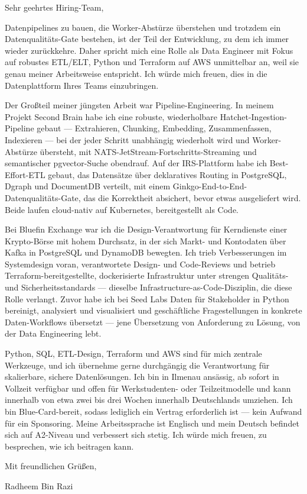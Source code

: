 \documentclass[11pt,a4paper]{coverletter}
\begin{document}
\opening{Sehr geehrtes Hiring-Team,}

Datenpipelines zu bauen, die Worker-Abstürze überstehen und trotzdem ein Datenqualitäts-Gate bestehen, ist der Teil der Entwicklung, zu dem ich immer wieder zurückkehre. Daher spricht mich eine Rolle als Data Engineer mit Fokus auf robustes ETL/ELT, Python und Terraform auf AWS unmittelbar an, weil sie genau meiner Arbeitsweise entspricht. Ich würde mich freuen, dies in die Datenplattform Ihres Teams einzubringen.

Der Großteil meiner jüngsten Arbeit war Pipeline-Engineering. In meinem Projekt Second Brain habe ich eine robuste, wiederholbare Hatchet-Ingestion-Pipeline gebaut — Extrahieren, Chunking, Embedding, Zusammenfassen, Indexieren — bei der jeder Schritt unabhängig wiederholt wird und Worker-Abstürze übersteht, mit NATS-JetStream-Fortschritts-Streaming und semantischer pgvector-Suche obendrauf. Auf der IRS-Plattform habe ich Best-Effort-ETL gebaut, das Datensätze über deklaratives Routing in PostgreSQL, Dgraph und DocumentDB verteilt, mit einem Ginkgo-End-to-End-Datenqualitäts-Gate, das die Korrektheit absichert, bevor etwas ausgeliefert wird. Beide laufen cloud-nativ auf Kubernetes, bereitgestellt als Code.

Bei Bluefin Exchange war ich die Design-Verantwortung für Kerndienste einer Krypto-Börse mit hohem Durchsatz, in der sich Markt- und Kontodaten über Kafka in PostgreSQL und DynamoDB bewegten. Ich trieb Verbesserungen im Systemdesign voran, verantwortete Design- und Code-Reviews und betrieb Terraform-bereitgestellte, dockerisierte Infrastruktur unter strengen Qualitäts- und Sicherheitsstandards — dieselbe Infrastructure-as-Code-Disziplin, die diese Rolle verlangt. Zuvor habe ich bei Seed Labs Daten für Stakeholder in Python bereinigt, analysiert und visualisiert und geschäftliche Fragestellungen in konkrete Daten-Workflows übersetzt — jene Übersetzung von Anforderung zu Lösung, von der Data Engineering lebt.

Python, SQL, ETL-Design, Terraform und AWS sind für mich zentrale Werkzeuge, und ich übernehme gerne durchgängig die Verantwortung für skalierbare, sichere Datenlösungen. Ich bin in Ilmenau ansässig, ab sofort in Vollzeit verfügbar und offen für Werkstudenten- oder Teilzeitmodelle und kann innerhalb von etwa zwei bis drei Wochen innerhalb Deutschlands umziehen. Ich bin Blue-Card-bereit, sodass lediglich ein Vertrag erforderlich ist — kein Aufwand für ein Sponsoring. Meine Arbeitssprache ist Englisch und mein Deutsch befindet sich auf A2-Niveau und verbessert sich stetig. Ich würde mich freuen, zu besprechen, wie ich beitragen kann.

\closing{Mit freundlichen Grüßen,}{Radheem Bin Razi}
\end{document}
